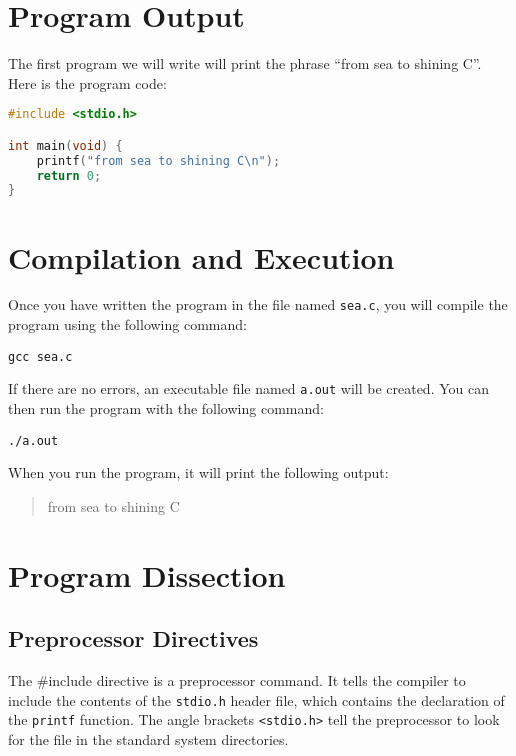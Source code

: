 \documentclass{article}
\begin{document}
\section{Program Output} \label{sec:program_output}

The first program we will write will print the phrase ``from sea to shining C''. Here is the program code:

\begin{lstlisting}[language=C]
#include <stdio.h>

int main(void) {
    printf("from sea to shining C\n");
    return 0;
}
\end{lstlisting}

\section*{Compilation and Execution}

Once you have written the program in the file named \texttt{sea.c}, you will compile the program using the following command:

\begin{lstlisting}
gcc sea.c
\end{lstlisting}

If there are no errors, an executable file named \texttt{a.out} will be created. You can then run the program with the following command:

\begin{lstlisting}
./a.out
\end{lstlisting}

When you run the program, it will print the following output:

\begin{quote}
from sea to shining C
\end{quote}

\section*{Program Dissection}

\subsection*{Preprocessor Directives}
The \#include directive is a preprocessor command. It tells the compiler to include the contents of the \texttt{stdio.h} header file, which contains the declaration of the \texttt{printf} function. The angle brackets \texttt{<stdio.h>} tell the preprocessor to look for the file in the standard system directories.
\end{document}
